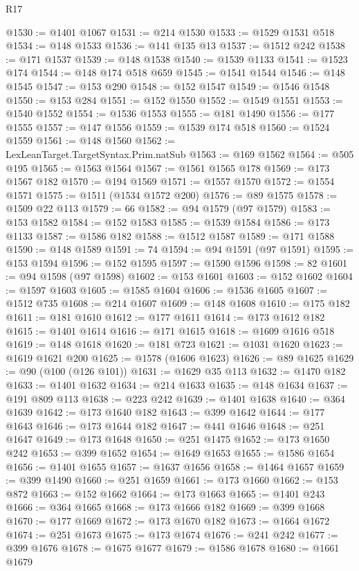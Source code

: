 \begin{lexlean}{R17}
\begin{coremodule}
@1530 := @1401 @1067
@1531 := @214 @1530
@1533 := @1529 @1531 @518
@1534 := @148 @1533
@1536 := @141 @135 @13
@1537 := @1512 @242
@1538 := @171 @1537
@1539 := @148 @1538
@1540 := @1539 @1133
@1541 := @1523 @174
@1544 := @148 @174 @518 @659
@1545 := @1541 @1544
@1546 := @148 @1545
@1547 := @153 @290
@1548 := @152 @1547
@1549 := @1546 @1548
@1550 := @153 @284
@1551 := @152 @1550
@1552 := @1549 @1551
@1553 := @1540 @1552
@1554 := @1536 @1553
@1555 := @181 @1490
@1556 := @177 @1555
@1557 := @147 @1556
@1559 := @1539 @174 @518
@1560 := @1524 @1559
@1561 := @148 @1560
@1562 := LexLeanTarget.TargetSyntax.Prim.natSub
@1563 := @169 @1562
@1564 := @505 @195
@1565 := @1563 @1564
@1567 := @1561 @1565 @178
@1569 := @173 @1567 @182
@1570 := @194 @1569
@1571 := @1557 @1570
@1572 := @1554 @1571
@1575 := @1511 (@1534 @1572 @200)
@1576 := @89 @1575
@1578 := @1509 @22 @113
@1579 := 66
@1582 := @94 @1579 (@97 @1579)
@1583 := @153 @1582
@1584 := @152 @1583
@1585 := @1539 @1584
@1586 := @173 @1133
@1587 := @1586 @182
@1588 := @1512 @1587
@1589 := @171 @1588
@1590 := @148 @1589
@1591 := 74
@1594 := @94 @1591 (@97 @1591)
@1595 := @153 @1594
@1596 := @152 @1595
@1597 := @1590 @1596
@1598 := 82
@1601 := @94 @1598 (@97 @1598)
@1602 := @153 @1601
@1603 := @152 @1602
@1604 := @1597 @1603
@1605 := @1585 @1604
@1606 := @1536 @1605
@1607 := @1512 @735
@1608 := @214 @1607
@1609 := @148 @1608
@1610 := @175 @182
@1611 := @181 @1610
@1612 := @177 @1611
@1614 := @173 @1612 @182
@1615 := @1401 @1614
@1616 := @171 @1615
@1618 := @1609 @1616 @518
@1619 := @148 @1618
@1620 := @181 @723
@1621 := @1031 @1620
@1623 := @1619 @1621 @200
@1625 := @1578 (@1606 @1623)
@1626 := @89 @1625
@1629 := @90 (@100 (@126 @101))
@1631 := @1629 @35 @113
@1632 := @1470 @182
@1633 := @1401 @1632
@1634 := @214 @1633
@1635 := @148 @1634
@1637 := @191 @809 @113
@1638 := @223 @242
@1639 := @1401 @1638
@1640 := @364 @1639
@1642 := @173 @1640 @182
@1643 := @399 @1642
@1644 := @177 @1643
@1646 := @173 @1644 @182
@1647 := @441 @1646
@1648 := @251 @1647
@1649 := @173 @1648
@1650 := @251 @1475
@1652 := @173 @1650 @242
@1653 := @399 @1652
@1654 := @1649 @1653
@1655 := @1586 @1654
@1656 := @1401 @1655
@1657 := @1637 @1656
@1658 := @1464 @1657
@1659 := @399 @1490
@1660 := @251 @1659
@1661 := @173 @1660
@1662 := @153 @872
@1663 := @152 @1662
@1664 := @173 @1663
@1665 := @1401 @243
@1666 := @364 @1665
@1668 := @173 @1666 @182
@1669 := @399 @1668
@1670 := @177 @1669
@1672 := @173 @1670 @182
@1673 := @1664 @1672
@1674 := @251 @1673
@1675 := @173 @1674
@1676 := @241 @242
@1677 := @399 @1676
@1678 := @1675 @1677
@1679 := @1586 @1678
@1680 := @1661 @1679

\end{coremodule}
\end{lexlean}
